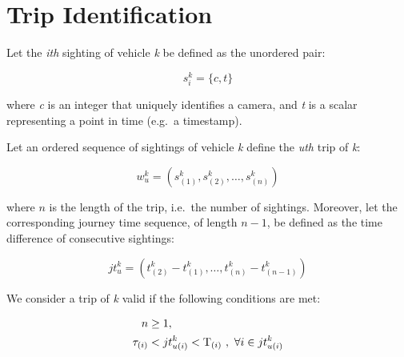 \section{Trip Identification}\label{s.trips}

Let the \emph{ith} sighting of vehicle \emph{k} be defined as the unordered pair:

\begin{equation} \label{e.sighting}
s^{k}_{i} = \{ c, t \}
\end{equation}

where \emph{c} is an integer that uniquely identifies a camera, and \emph{t} is a scalar representing a point in time (e.g.\ a timestamp).

Let an ordered sequence of sightings of vehicle \emph{k} define the \emph{uth} trip of \emph{k}:

\begin{equation} \label{e.trip}
w^{k}_{u} = \left(s^{k}_{(1)}, s^{k}_{(2)}, \dots , s^{k}_{(n)}\right)
\end{equation}

where \( n \) is the length of the trip, i.e.\ the number of sightings. Moreover, let the corresponding journey time sequence, of length \(n-1\), be defined as the time difference of consecutive sightings:

\begin{equation} \label{e.journeytime}
jt^{k}_{u} = \left(t^{k}_{(2)} - t^{k}_{(1)}, \ldots, t^{k}_{(n)} - t^{k}_{(n-1)} \right)
\end{equation}

We consider a trip of \emph{k} valid if the following conditions are met:

\begin{align}
n &\ge 1 , \label{e.trip.constraints.1} \\
\tau_{(i)} &< jt^{k}_{u(i)} < \mathrm{T}_{(i)} \ , \ \forall i \in jt^{k}_{u(i)} \label{e.trip.constraints.2}
\end{align}

